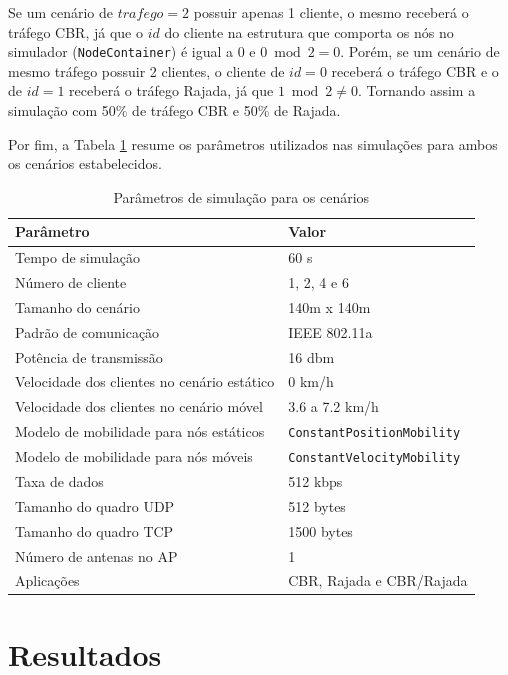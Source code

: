 \documentclass[12pt]{article}
\begin{document}
Se um cenário de $trafego = 2$ possuir apenas 1 cliente, o mesmo receberá o tráfego CBR, já que o $id$ do cliente na estrutura que comporta os nós no simulador (\texttt{NodeContainer}) é igual a $0$ e $0 \bmod 2 = 0$. Porém, se um cenário de mesmo tráfego possuir 2 clientes, o cliente de $id = 0$ receberá o tráfego CBR e o de $id = 1$ receberá o tráfego Rajada, já que $1 \bmod 2 \neq 0$. Tornando assim a simulação com 50\% de tráfego CBR e 50\% de Rajada.

Por fim, a Tabela \ref{tab:parametros_16} resume os parâmetros utilizados nas simulações para ambos os cenários estabelecidos.

\begin{table}[!ht]
\centering
\caption{Parâmetros de simulação para os cenários}
\vspace{0.1cm} %
\label{tab:parametros_16}
\begin{tabular}{ll}
\hline
 \textbf{Parâmetro} & \textbf{Valor} \\
\hline
 Tempo de simulação & 60 s \\
 Número de cliente & 1, 2, 4 e 6 \\
 Tamanho do cenário & 140m x 140m \\
 Padrão de comunicação & IEEE 802.11a \\
 Potência de transmissão & 16 dbm\\
 Velocidade dos clientes no cenário estático & 0 km/h \\
 Velocidade dos clientes no cenário móvel & 3.6 a 7.2 km/h \\
 Modelo de mobilidade para nós estáticos & \texttt{ConstantPositionMobility} \\
 Modelo de mobilidade para nós móveis & \texttt{ConstantVelocityMobility} \\
 Taxa de dados & 512 kbps \\
 Tamanho do quadro UDP & 512 bytes\\
 Tamanho do quadro TCP & 1500 bytes \\
 Número de antenas no AP & 1 \\
 Aplicações & CBR, Rajada e CBR/Rajada\\
\hline
\end{tabular}
\end{table}

\section{Resultados}
\label{resultados}
\end{document}

